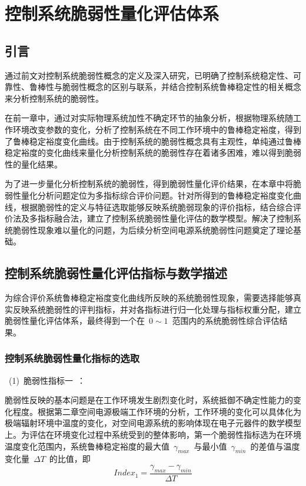 \chapter{控制系统脆弱性量化评估体系}
\label{cha:Design}
\section{引言}
\label{sec:chap4:int}
通过前文对控制系统脆弱性概念的定义及深入研究，已明确了控制系统稳定性、可靠性、鲁棒性与脆弱性概念的区别与联系，并结合控制系统鲁棒稳定性的相关概念来分析控制系统的脆弱性。

在前一章中，通过对实际物理系统加性不确定环节的抽象分析，根据物理系统随工作环境改变参数的变化，分析了控制系统在不同工作环境中的鲁棒稳定裕度，得到了鲁棒稳定裕度变化曲线。由于控制系统的脆弱性概念具有主观性，单纯通过鲁棒稳定裕度的变化曲线来量化分析控制系统的脆弱性存在着诸多困难，难以得到脆弱性的量化结果。

为了进一步量化分析控制系统的脆弱性，得到脆弱性量化评价结果，在本章中将脆弱性量化分析问题定位为多指标综合评价问题。针对所得到的鲁棒稳定裕度变化曲线，根据脆弱性的定义与特征选取能够反映系统脆弱现象的评价指标，结合综合评价法及多指标融合法，建立了控制系统脆弱性量化评估的数学模型。解决了控制系统脆弱性现象难以量化的问题，为后续分析空间电源系统脆弱性问题奠定了理论基础。
\section{控制系统脆弱性量化评估指标与数学描述}
\label{sec:chap4:Fragility_Mathdiscribe}
为综合评价系统鲁棒稳定裕度变化曲线所反映的系统脆弱性现象，需要选择能够真实反映系统脆弱性的评判指标，并对各指标进行归一化处理与指标权重分配，建立脆弱性量化评估体系，最终得到一个在~$0\sim1$~范围内的系统脆弱性综合评估结果。
\subsection{控制系统脆弱性量化指标的选取}
\label{sub:chap4:Fragility_Index}
 ~(1)~脆弱性指标一~：

脆弱性反映的基本问题是在工作环境发生剧烈变化时，系统抵御不确定性能力的变化程度。根据第二章空间电源极端工作环境的分析，工作环境的变化可以具体化为极端辐射环境中温度的变化，对空间电源系统的影响体现在电子元器件的数学模型上。为评估在环境变化过程中系统受到的整体影响，第一个脆弱性指标选为在环境温度变化范围内，系统鲁棒稳定裕度的最大值~$\gamma_{max}$~与最小值~$\gamma_{min}$~的差值与温度变化量~$\Delta T$~的比值，即
\begin{equation}\label{equ:chap4:Index1}
  Index_1=\frac{\gamma_{max}-\gamma_{min}}{\Delta T}
\end{equation}

